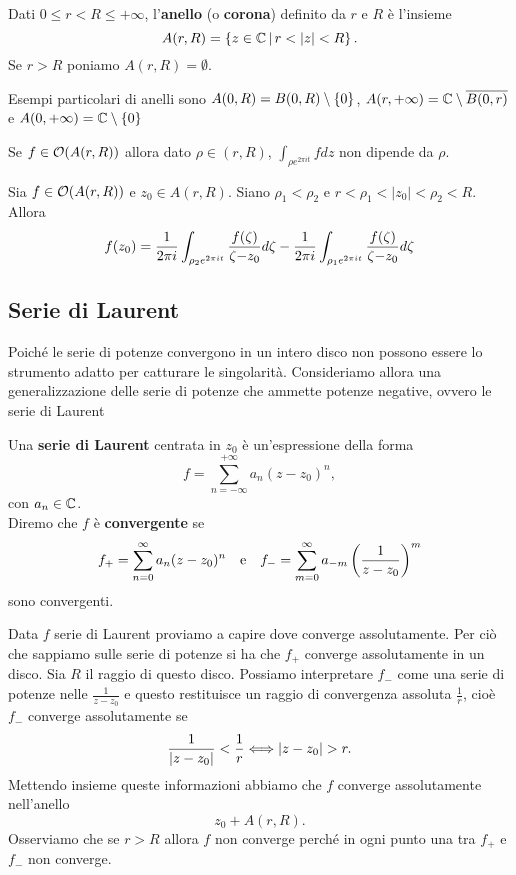 \begin{multicols*}{2}
\begin{definition}[Corona]
Dati $0\leq r<R\leq+\infty$, l'\textbf{anello} (o \textbf{corona}) definito da $r$ e $R$ \`e l'insieme
\[A(r,R)=\cpa{z\in\C\sep r<|z|<R}.\]
Se $r>R$ poniamo $A(r,R)=\emptyset$.
\end{definition}
\begin{remark}
Esempi particolari di anelli sono $A(0,R)=B(0,R)\setminus\{0\}$, $A(r,+\infty)=\mathbb{C}\setminus\overline{B(0,r)}$ e $A(0,+\infty)=\mathbb{C}\setminus\{0\}$
\end{remark}
\begin{lemma}\label{IntegraleDiUnGiroAttornoAnelloNonDipendeDallaDistanzaDalCentro}
Se $f\in \mathcal{O}(A(r,R))$ allora dato $\rho\in(r,R)$, $\int_{\rho e^{2\pi it}}fdz$ non dipende da $\rho$.
\end{lemma}
\begin{lemma}\label{ValoriOlomorfaSuAnelloComeSottrazioneDiIntegrali}
Sia $f\in \mathcal{O}(A(r,R))$ e $z_0\in A(r,R)$. Siano $\rho_1<\rho_2$ e $r<\rho_1<|z_0|<\rho_2<R$. Allora
\[f(z_0)=\cauchyint{\rho_2e^{2\pi it}}-\cauchyint{\rho_1e^{2\pi it}}\]
\end{lemma}

\subsection{Serie di Laurent}
Poich\'e le serie di potenze convergono in un intero disco non possono essere lo strumento adatto per catturare le singolarit\`a. Consideriamo allora una generalizzazione delle serie di potenze che ammette potenze negative, ovvero le serie di Laurent
\begin{definition}
Una \textbf{serie di Laurent} centrata in $z_0$ \`e un'espressione della forma
\[f=\sum_{n=-\infty}^{+\infty}a_n(z-z_0)^n,\]
con $a_n\in\mathbb{C}$.\\
Diremo che $f$ \`e \textbf{convergente} se
\[f_+=\sum_{n=0}^\infty a_n(z-z_0)^n\quad \text{e}\quad f_-=\sum_{m=0}^\infty a_{-m}\left(\frac1{z-z_0}\right)^m\]
sono convergenti.
\end{definition}
\begin{remark}
Data $f$ serie di Laurent proviamo a capire dove converge assolutamente. Per ci\`o che sappiamo sulle serie di potenze si ha che $f_+$ converge assolutamente in un disco. Sia $R$ il raggio di questo disco. Possiamo interpretare $f_-$ come una serie di potenze nelle $\frac1{z-z_0}$ e questo restituisce un raggio di convergenza assoluta $\frac1r$, cio\`e $f_-$ converge assolutamente se
\[\frac1{|z-z_0|}<\frac1r\coimplies |z-z_0|>r.\]
Mettendo insieme queste informazioni abbiamo che $f$ converge assolutamente nell'anello
\[z_0+A(r,R).\]
Osserviamo che se $r>R$ allora $f$ non converge perch\'e in ogni punto una tra $f_+$ e $f_-$ non converge.
\end{remark}



\end{multicols*}
